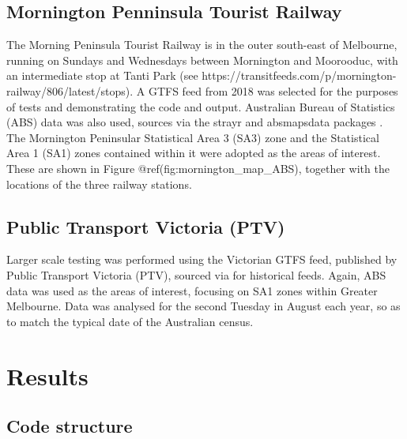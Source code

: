 \documentclass[preprint, 3p,
authoryear]{elsarticle} %
\begin{document}
\hypertarget{mornington-penninsula-tourist-railway}{%
\subsection{Mornington Penninsula Tourist
Railway}\label{mornington-penninsula-tourist-railway}}

The Morning Peninsula Tourist Railway is in the outer south-east of
Melbourne, running on Sundays and Wednesdays between Mornington and
Moorooduc, with an intermediate stop at Tanti Park (see
https://transitfeeds.com/p/mornington-railway/806/latest/stops). A GTFS
feed from 2018 was selected for the purposes of tests and demonstrating
the code and output. Australian Bureau of Statistics (ABS) data was also
used, sources via the strayr and absmapsdata packages \citep{r-strayr}.
The Mornington Peninsular Statistical Area 3 (SA3) zone and the
Statistical Area 1 (SA1) zones contained within it were adopted as the
areas of interest. These are shown in Figure
@ref(fig:mornington\_map\_ABS), together with the locations of the three
railway stations.

\hypertarget{public-transport-victoria-ptv}{%
\subsection{Public Transport Victoria
(PTV)}\label{public-transport-victoria-ptv}}

Larger scale testing was performed using the Victorian GTFS feed,
published by Public Transport Victoria (PTV), sourced via
\citet{transitfeeds_victoria:2023aa} for historical feeds. Again, ABS
data was used as the areas of interest, focusing on SA1 zones within
Greater Melbourne. Data was analysed for the second Tuesday in August
each year, so as to match the typical date of the Australian census.

\hypertarget{results}{%
\section{Results}\label{results}}

\hypertarget{code-structure}{%
\subsection{Code structure}\label{code-structure}}
\end{document}
